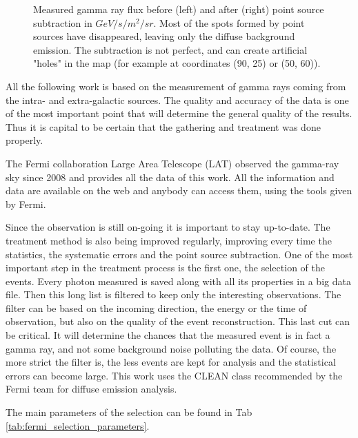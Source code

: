 \begin{figure}[h]
\begin{minipage}[h]{0.45\textwidth}
	  \subcaption{}
	  \label{fig:data_ptsrc_subtracted}
  \end{minipage}
  \caption{Measured gamma ray flux before (left) and after (right) point source subtraction in $GeV/s/m^2/sr$. Most of the spots formed by point sources have disappeared, leaving only the diffuse background emission. The subtraction is not perfect, and can create artificial "holes" in the map (for example at coordinates (90, 25) or (50, 60)).}
  \label{fig:method_pass8} 
\end{figure}

All the following work is based on the measurement of gamma rays coming from the intra- and extra-galactic sources. The quality and accuracy of the data is one of the most important point that will determine the general quality of the results. Thus it is capital to be certain that the gathering and treatment was done properly.

The Fermi collaboration Large Area Telescope (LAT) observed the gamma-ray sky since 2008 and provides all the data of this work.
All the information and data are available on the web and anybody can access them, using the tools given by Fermi.

Since the observation is still on-going it is important to stay up-to-date. The treatment method is also being improved regularly, improving every time the statistics, the systematic errors and the point source subtraction.
One of the most important step in the treatment process is the first one, the selection of the events. Every photon measured is saved along with all its properties in a big data file. Then this long list is filtered to keep only the interesting observations. The filter can be based on the incoming direction, the energy or the time of observation, but also on the quality of the event reconstruction. This last cut can be critical. It will determine the chances that the measured event is in fact a gamma ray, and not some background noise polluting the data. Of course, the more strict the filter is, the less events are kept for analysis and the statistical errors can become large. This work uses the CLEAN class recommended by the Fermi team for diffuse emission analysis.

The main parameters of the selection can be found in Tab \ref{tab:fermi_selection_parameters}.

